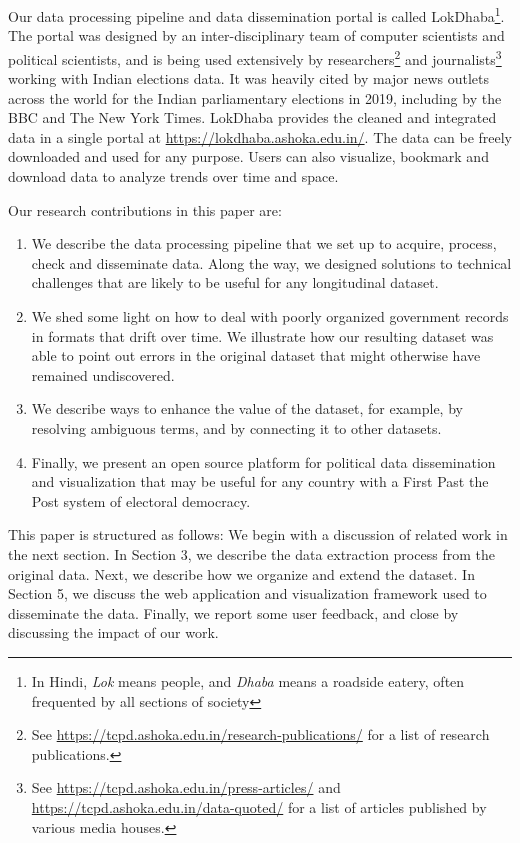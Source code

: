 Our data processing pipeline and data dissemination portal is called LokDhaba\footnote{In Hindi, {\it Lok} means people, and {\it Dhaba} means a roadside eatery, often frequented by all sections of society}. The portal was designed by an inter-disciplinary team of computer scientists and political scientists, and is being used extensively by researchers\footnote{See {\href{https://tcpd.ashoka.edu.in/research-publications/}{https://tcpd.ashoka.edu.in/research-publications/}} for a list of research publications.} and journalists\footnote{See {\href{https://tcpd.ashoka.edu.in/press-articles/}{https://tcpd.ashoka.edu.in/press-articles/}} and {\href{https://tcpd.ashoka.edu.in/data-quoted/}{https://tcpd.ashoka.edu.in/data-quoted/}} for a list of articles published by various media houses.} working with Indian elections data. It was heavily cited by major news outlets across the world for the Indian parliamentary elections in 2019, including by the BBC and The New York Times. LokDhaba provides the cleaned and integrated data in a single portal at {\href{https://lokdhaba.ashoka.edu.in/}{https://lokdhaba.ashoka.edu.in/}}. The data can be freely downloaded and used for any purpose. Users can also visualize, bookmark and download data to analyze trends over time and space. 

Our research contributions in this paper are:
\begin{enumerate}
    \item We describe the data processing pipeline that we set up to acquire, process, check and disseminate data. Along the way, we designed solutions to technical challenges that are likely to be useful for any longitudinal dataset.
    \item We shed some light on how to deal with poorly organized government records in formats that drift over time. We illustrate how our resulting dataset was able to point out errors in the original dataset that might otherwise have remained undiscovered. 
    \item We describe ways to enhance the value of the dataset, for example, by resolving ambiguous terms, and by connecting it to other datasets. 
    \item Finally, we present an open source platform for political data dissemination and visualization that may be useful for any country with a First Past the Post system of electoral democracy. 
\end{enumerate}

This paper is structured as follows: We begin with a discussion of related work in the next section. In Section 3, we describe the data extraction process from the original data. Next, we describe how we organize and extend the dataset. In Section 5, we discuss the web application and visualization framework used to disseminate the data. Finally, we report some user feedback, and close by discussing the impact of our work.
